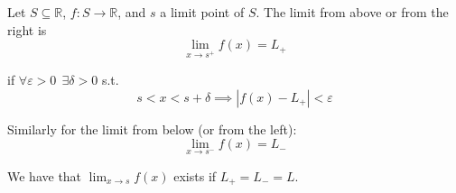 \documentclass{article}
\begin{document}
\begin{definition}
  Let $S \subseteq \mathbb{R}$, $f: S \to \mathbb{R}$, and $s$ a limit point of $S$. The limit from above or from the right is
  \[
    \lim_{x \to s^+} f(x) = L_+
  \]

  if $\forall \varepsilon > 0 ~~ \exists \delta > 0$ s.t.
  \[
    s < x < s + \delta
    \implies
    |f(x) - L_+| < \varepsilon
  \]

  Similarly for the limit from below (or from the left):
  \[
    \lim_{x \to s^-} f(x) = L_-
  \]

  We have that $\lim_{x \to s} f(x)$ exists if $L_{+} = L_{-} = L$.
\end{definition}

\clearpage
\printindex

\end{document}

